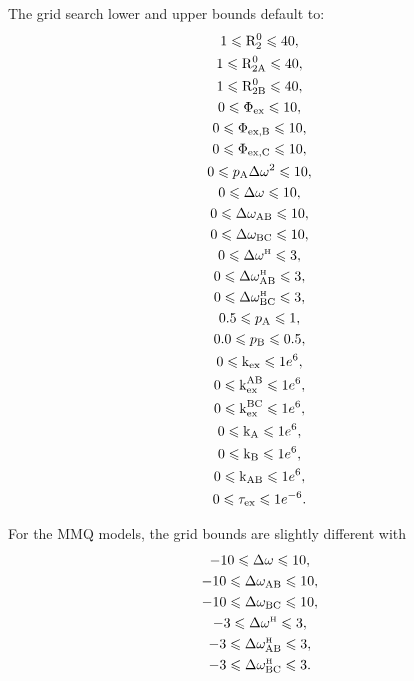 The grid search lower and upper bounds default to:
\begin{subequations}
\begin{gather} 
    1 \leqslant \mathrm{R}_2^0 \leqslant 40, \\
    1 \leqslant \mathrm{R}_\mathrm{2A}^0 \leqslant 40, \\
    1 \leqslant \mathrm{R}_\mathrm{2B}^0 \leqslant 40, \\
    0 \leqslant \Phi_\textrm{ex} \leqslant 10, \\
    0 \leqslant \Phi_\textrm{ex,B} \leqslant 10, \\
    0 \leqslant \Phi_\textrm{ex,C} \leqslant 10, \\
    0 \leqslant p_\textrm{A}\Delta\omega^2 \leqslant 10, \\
    0 \leqslant \Delta\omega \leqslant 10, \\
    0 \leqslant \Delta\omega_\textrm{AB} \leqslant 10, \\
    0 \leqslant \Delta\omega_\textrm{BC} \leqslant 10, \\
    0 \leqslant \Delta\omega^{\scriptscriptstyle\mathrm{H}} \leqslant 3, \\
    0 \leqslant \Delta\omega^{\scriptscriptstyle\mathrm{H}}_\textrm{AB} \leqslant 3, \\
    0 \leqslant \Delta\omega^{\scriptscriptstyle\mathrm{H}}_\textrm{BC} \leqslant 3, \\
    0.5 \leqslant p_\textrm{A} \leqslant 1, \\
    0.0 \leqslant p_\textrm{B} \leqslant 0.5, \\
    0 \leqslant \textrm{k}_\textrm{ex} \leqslant 1e^6, \\
    0 \leqslant \textrm{k}_\textrm{ex}^\textrm{AB} \leqslant 1e^6, \\
    0 \leqslant \textrm{k}_\textrm{ex}^\textrm{BC} \leqslant 1e^6, \\
    0 \leqslant \textrm{k}_\textrm{A} \leqslant 1e^6, \\
    0 \leqslant \textrm{k}_\textrm{B} \leqslant 1e^6, \\
    0 \leqslant \textrm{k}_\textrm{AB} \leqslant 1e^6, \\
    0 \leqslant \tau_\textrm{ex} \leqslant 1e^{-6}.
\end{gather} 
\end{subequations}

For the MMQ models, the grid bounds are slightly different with
\begin{subequations}
\begin{gather} 
    -10 \leqslant \Delta\omega \leqslant 10, \\
    -10 \leqslant \Delta\omega_\textrm{AB} \leqslant 10, \\
    -10 \leqslant \Delta\omega_\textrm{BC} \leqslant 10, \\
    -3 \leqslant \Delta\omega^{\scriptscriptstyle\mathrm{H}} \leqslant 3, \\
    -3 \leqslant \Delta\omega^{\scriptscriptstyle\mathrm{H}}_\textrm{AB} \leqslant 3, \\
    -3 \leqslant \Delta\omega^{\scriptscriptstyle\mathrm{H}}_\textrm{BC} \leqslant 3.
\end{gather} 
\end{subequations}

